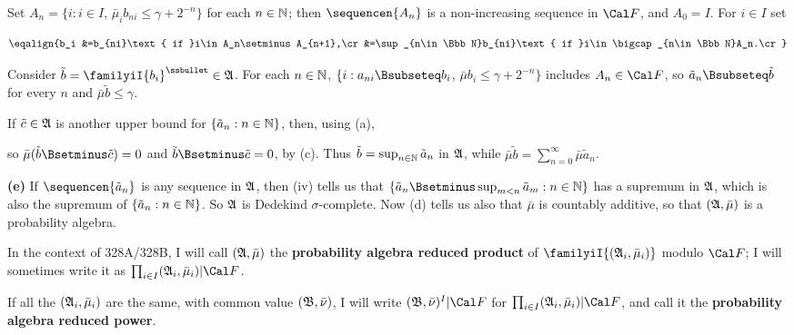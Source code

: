 {

\noindent Set $A_n=\{i:i\in I$, $\bar\mu_ib_{ni}\le\gamma+2^{-n}\}$ for
each $n\in\Bbb N$;  then $\sequencen{A_n}$ is a non-increasing sequence in
$\Cal F$, and $A_0=I$.   For $i\in I$ set

$$\eqalign{b_i
&=b_{ni}\text{ if }i\in A_n\setminus A_{n+1},\cr
&=\sup_{n\in\Bbb N}b_{ni}\text{ if }i\in\bigcap_{n\in\Bbb N}A_n.\cr}$$

\noindent Consider $\tilde b=\familyiI{b_i}^{\ssbullet}\in\frak A$.
For each
$n\in\Bbb N$, $\{i:a_{ni}\Bsubseteq b_i$, $\bar\mu b_i\le\gamma+2^{-n}\}$
includes $A_n\in\Cal F$, so
$\tilde a_n\Bsubseteq\tilde b$ for every $n$ and
$\bar\mu\tilde b\le\gamma$.

If $\tilde c\in\frak A$ is another upper bound for
$\{\tilde a_n:n\in\Bbb N\}$, then, using (a),


\noindent so $\bar\mu(\tilde b\Bsetminus\tilde c)=0$ and
$\tilde b\Bsetminus\tilde c=0$, by (c).
Thus $\tilde b=\sup_{n\in\Bbb N}\tilde a_n$ in $\frak A$, while
$\bar\mu\tilde b=\sum_{n=0}^{\infty}\bar\mu\tilde a_n$.

\medskip

{\bf (e)} If $\sequencen{\tilde a_n}$ is any sequence in
$\frak A$, then (iv) tells us that
$\{\tilde a_n\Bsetminus\sup_{m<n}\tilde a_m:n\in\Bbb N\}$
has a supremum in $\frak A$, which is also the supremum of
$\{\tilde a_n:n\in\Bbb N\}$.   So $\frak A$ is Dedekind $\sigma$-complete.
Now (d) tells us also that $\bar\mu$ is countably additive, so that
$(\frak A,\bar\mu)$ is a probability algebra.
}%

 In the context of 328A/328B,
I will call $(\frak A,\bar\mu)$ the {\bf probability
algebra reduced product} of $\familyiI{(\frak A_i,\bar\mu_i)}$
modulo $\Cal F$;  I will
sometimes write it as $\prod_{i\in I}(\frak A_i,\bar\mu_i)|\Cal F$.

If all the $(\frak A_i,\bar\mu_i)$ are the same, with common value
$(\frak B,\bar\nu)$, I will write
$(\frak B,\bar\nu)^I|\Cal F$ for
$\prod_{i\in I}(\frak A_i,\bar\mu_i)|\Cal F$, and call it the
{\bf probability algebra reduced power}.

